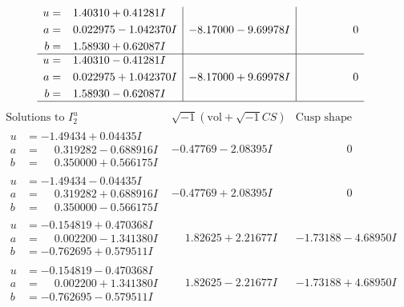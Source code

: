 \documentclass[1p]{elsarticle_modified}
\theoremstyle{definition}
\newcommand{\I}{\sqrt{-1}}
\begin{document}
$$\begin{array}{c|c|c}
\begin{aligned}
u &= \phantom{-}1.40310 + 0.41281 I \\
a &= \phantom{-}0.022975 - 1.042370 I \\
b &= \phantom{-}1.58930 + 0.62087 I\end{aligned}
 & -8.17000 - 9.69978 I & \phantom{-0.000000 } 0 \\ \hline\begin{aligned}
u &= \phantom{-}1.40310 - 0.41281 I \\
a &= \phantom{-}0.022975 + 1.042370 I \\
b &= \phantom{-}1.58930 - 0.62087 I\end{aligned}
 & -8.17000 + 9.69978 I & \phantom{-0.000000 } 0\\
 \hline 
 \end{array}$$\newpage$$\begin{array}{c|c|c}  
\text{Solutions to }I^u_{2}& \I (\text{vol} + \sqrt{-1}CS) & \text{Cusp shape}\\
 \hline 
\begin{aligned}
u &= -1.49434 + 0.04435 I \\
a &= \phantom{-}0.319282 - 0.688916 I \\
b &= \phantom{-}0.350000 + 0.566175 I\end{aligned}
 & -0.47769 - 2.08395 I & \phantom{-0.000000 } 0 \\ \hline\begin{aligned}
u &= -1.49434 - 0.04435 I \\
a &= \phantom{-}0.319282 + 0.688916 I \\
b &= \phantom{-}0.350000 - 0.566175 I\end{aligned}
 & -0.47769 + 2.08395 I & \phantom{-0.000000 } 0 \\ \hline\begin{aligned}
u &= -0.154819 + 0.470368 I \\
a &= \phantom{-}0.002200 - 1.341380 I \\
b &= -0.762695 + 0.579511 I\end{aligned}
 & \phantom{-}1.82625 + 2.21677 I & -1.73188 - 4.68950 I \\ \hline\begin{aligned}
u &= -0.154819 - 0.470368 I \\
a &= \phantom{-}0.002200 + 1.341380 I \\
b &= -0.762695 - 0.579511 I\end{aligned}
 & \phantom{-}1.82625 - 2.21677 I & -1.73188 + 4.68950 I \\ \hline\begin{aligned}

\end{aligned}
\end{array}$$
\end{document}
